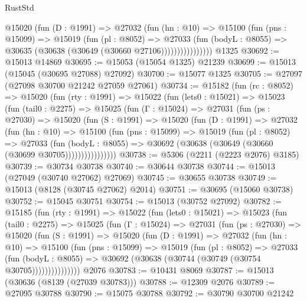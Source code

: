 \begin{lexlean}{RustStd}
\begin{coremodule}
                  @15020
                    (fun (D : @1991) =>
                    @27032
                      (fun (hn : @10) =>
                      @15100
                        (fun (pns : @15099) =>
                        @15019
                          (fun (pl : @8052) =>
                          @27033
                            (fun (bodyL : @8055) =>
                            @30635 (@30638 (@30649 (@30660 @27106))))))))))))))))
    @1325
@30692 := @15013 @14869
@30695 := @15053 (@15054 @1325) @21239
@30699 := @15013 (@15045 (@30695 @27088) @27092)
@30700 := @15077 @1325
@30705 := @27097 (@27098 @30700 @21242 @27059 @27061)
@30734 := @15182
    (fun (rc : @8052) =>
    @15020
      (fun (rty : @1991) =>
      @15022
        (fun (lets0 : @15021) =>
        @15023
          (fun (tail0 : @2275) =>
          @15025
            (fun (Γ : @15024) =>
            @27031
              (fun (ps : @27030) =>
              @15020
                (fun (S : @1991) =>
                @15020
                  (fun (D : @1991) =>
                  @27032
                    (fun (hn : @10) =>
                    @15100
                      (fun (pns : @15099) =>
                      @15019
                        (fun (pl : @8052) =>
                        @27033
                          (fun (bodyL : @8055) =>
                          @30692 (@30638 (@30649 (@30660 (@30699 @30705))))))))))))))))
@30738 := @5306 (@2211 (@2223 @2076) @3185)
@30739 := @30734 @30738
@30740 := @30644 @30738
@30744 := @15013 (@27049 (@30740 @27062) @27069)
@30745 := @30655 @30738
@30749 := @15013 (@8128 (@30745 @27062) @2014)
@30751 := @30695 (@15060 @30738)
@30752 := @15045 @30751
@30754 := @15013 (@30752 @27092)
@30782 := @15185
    (fun (rty : @1991) =>
    @15022
      (fun (lets0 : @15021) =>
      @15023
        (fun (tail0 : @2275) =>
        @15025
          (fun (Γ : @15024) =>
          @27031
            (fun (ps : @27030) =>
            @15020
              (fun (S : @1991) =>
              @15020
                (fun (D : @1991) =>
                @27032
                  (fun (hn : @10) =>
                  @15100
                    (fun (pns : @15099) =>
                    @15019
                      (fun (pl : @8052) =>
                      @27033
                        (fun (bodyL : @8055) =>
                        @30692 (@30638 (@30744 (@30749 (@30754 @30705)))))))))))))))
    @2076
@30783 := @10431 @8069
@30787 := @15013 (@30636 (@8139 (@27039 @30783)))
@30788 := @12309 @2076
@30789 := @27095 @30788
@30790 := @15075 @30788
@30792 := @30790 @30700 @21242

\end{coremodule}
\end{lexlean}
